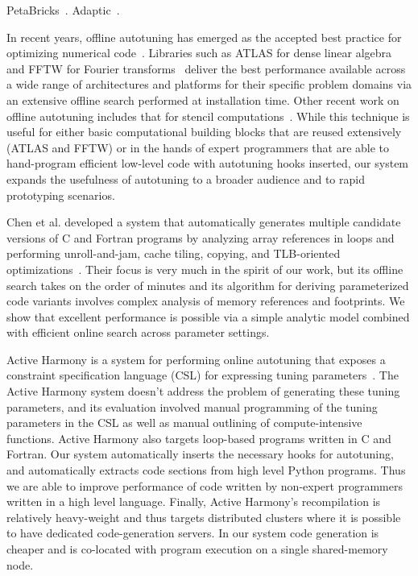 \documentclass[preprint,9pt]{sigplanconf}
\begin{document}
PetaBricks~\cite{Anse09}.  Adaptic~\cite{Sama12}.

In recent years, offline autotuning has emerged as the accepted best practice for optimizing numerical code~\cite{Asan06}.  Libraries such as ATLAS for dense linear algebra~\cite{Whal00} and FFTW for Fourier transforms~\cite{Frig05} deliver the best performance available across a wide range of architectures and platforms for their specific problem domains via an extensive offline search performed at installation time.  Other recent work on offline autotuning includes that for stencil computations~\cite{Kami10,Datt08}.  While this technique is useful for either basic computational building blocks that are reused extensively (ATLAS and FFTW) or in the hands of expert programmers that are able to hand-program efficient low-level code with autotuning hooks inserted, our system expands the usefulness of autotuning to a broader audience and to rapid prototyping scenarios.

Chen et al. developed a system that automatically generates multiple candidate versions of C and Fortran programs by analyzing array references in loops and performing unroll-and-jam, cache tiling, copying, and TLB-oriented optimizations~\cite{Chen05b}.  Their focus is very much in the spirit of our work, but its offline search takes on the order of minutes and its algorithm for deriving parameterized code variants involves complex analysis of memory references and footprints.  We show that excellent performance is possible via a simple analytic model combined with efficient online search across parameter settings.

Active Harmony is a system for performing online autotuning that exposes a constraint specification language (CSL) for expressing tuning parameters~\cite{Tiwa11}.  The Active Harmony system doesn't address the problem of generating these tuning parameters, and its evaluation involved manual programming of the tuning parameters in the CSL as well as manual outlining of compute-intensive functions.  Active Harmony also targets loop-based programs written in C and Fortran.  Our system automatically inserts the necessary hooks for autotuning, and automatically extracts code sections from high level Python programs.  Thus we are able to improve performance of code written by non-expert programmers written in a high level language.  Finally, Active Harmony's recompilation is relatively heavy-weight and thus targets distributed clusters where it is possible to have dedicated code-generation servers.  In our system code generation is cheaper and is co-located with program execution on a single shared-memory node.
\end{document}
